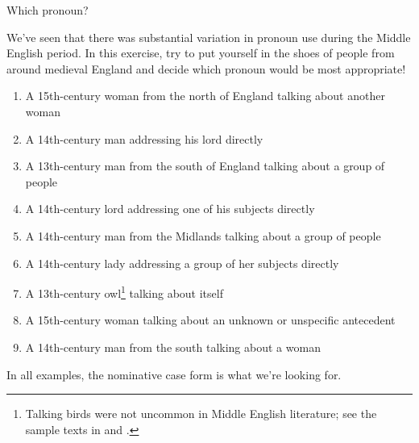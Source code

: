 \begin{exercises}{Which pronoun?}\label{exercise-ME-pronouns}

We've seen that there was substantial variation in pronoun use during the Middle English period. In this exercise, try to put yourself in the shoes of people from around medieval England and decide which pronoun would be most appropriate!

\begin{enumerate}
    \item A 15th-century woman from the north of England talking about another woman
    \item A 14th-century man addressing his lord directly
    \item A 13th-century man from the south of England talking about a group of people
    \item A 14th-century lord addressing one of his subjects directly
    \item A 14th-century man from the Midlands talking about a group of people
    \item A 14th-century lady addressing a group of her subjects directly
    \item A 13th-century owl\footnote{Talking birds were not uncommon in Middle English literature; see the sample texts in  and .} talking about itself
    \item A 15th-century woman talking about an unknown or unspecific antecedent
    \item A 14th-century man from the south talking about a woman
\end{enumerate}

\noindent In all examples, the nominative case form is what we're looking for.

\end{exercises}
\largerpage


